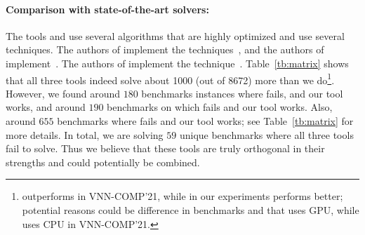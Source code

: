 \paragraph{Comparison with state-of-the-art solvers: }
The tools \alphabeta{} and \ovaltool{} use several algorithms that are highly optimized and use several techniques. 
The authors of \alphabeta{} implement the techniques~\cite{zhang2018efficient,wang2021beta,xu2020fast,zhang2022branch,tjeng2017evaluating}, 
and the authors of \ovaltool{} implement~\cite{bunel2018unified,bunel2020branch,bunel2020lagrangian,de2021scaling,de2021scaling,de2021scaling2,de2021improved}.
The authors of \marabou{} implement the technique~\cite{katz2019marabou}. 
Table~\ref{tb:matrix} shows that all three tools indeed solve about 1000 (out of 8672) more than 
we do\footnote{\alphabeta{} outperforms \marabou{} in VNN-COMP'21, while in our experiments \marabou{} performs better; potential reasons could be difference in benchmarks and that \alphabeta{} uses \textsc{GPU}, while \marabou{} uses \textsc{CPU} in VNN-COMP'21.}. 
However, we found around $180$ benchmarks instances where \alphabeta{} fails, and our tool works, 
and around $190$ benchmarks on which \ovaltool{} fails and our tool works. 
Also, around $655$ benchmarks where \marabou{} fails and our tool works; see Table~\ref{tb:matrix} for more details. 
In total, we are solving $59$ unique benchmarks where all three tools fail to solve. 
Thus we believe that these tools are truly orthogonal in their strengths and could potentially be combined. 




